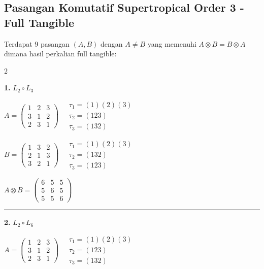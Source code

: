 
\subsection*{Pasangan Komutatif Supertropical Order 3 - Full Tangible}

Terdapat 9 pasangan $(A, B)$ dengan $A \neq B$ yang memenuhi $A \otimes B = B \otimes A$
dimana hasil perkalian full tangible:

\begin{multicols}{2}
\small

\noindent\textbf{1.} $L_{2} \circ L_{3}$

$A = \begin{pmatrix} 1 & 2 & 3 \\ 3 & 1 & 2 \\ 2 & 3 & 1 \end{pmatrix} \quad \begin{matrix} \tau_{1}=(1)(2)(3) \\ \tau_{2}=(1 2 3) \\ \tau_{3}=(1 3 2) \end{matrix}$

$B = \begin{pmatrix} 1 & 3 & 2 \\ 2 & 1 & 3 \\ 3 & 2 & 1 \end{pmatrix} \quad \begin{matrix} \tau_{1}=(1)(2)(3) \\ \tau_{2}=(1 3 2) \\ \tau_{3}=(1 2 3) \end{matrix}$

$A \otimes B = \begin{pmatrix} 6 & 5 & 5 \\ 5 & 6 & 5 \\ 5 & 5 & 6 \end{pmatrix}$

\vspace{0.3em}
\hrule
\vspace{0.3em}

\noindent\textbf{2.} $L_{2} \circ L_{6}$

$A = \begin{pmatrix} 1 & 2 & 3 \\ 3 & 1 & 2 \\ 2 & 3 & 1 \end{pmatrix} \quad \begin{matrix} \tau_{1}=(1)(2)(3) \\ \tau_{2}=(1 2 3) \\ \tau_{3}=(1 3 2) \end{matrix}$


\end{multicols}
